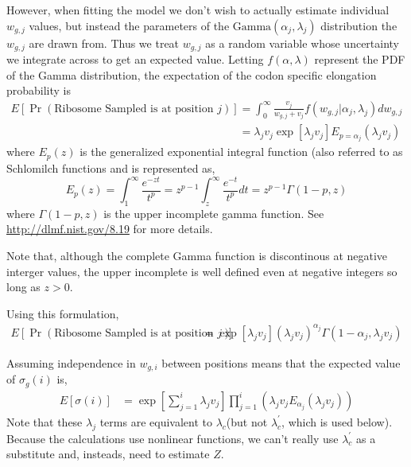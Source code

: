 \documentclass{article}
\newcommand{\elongWaitTime}{\ensuremath{w}\xspace}
\newcommand{\wgi}{\ensuremath{\elongWaitTime_{g,i}}\xspace}
\newcommand{\wgj}{\ensuremath{\elongWaitTime_{g,j}}\xspace}
\newcommand{\alphaj}{\ensuremath{{\alpha_j}}\xspace}
\newcommand{\lambdac}{\ensuremath{{\lambda_c}}\xspace}
\newcommand{\lambdacprime}{\ensuremath{{\lambda_c^\prime}}\xspace}
\newcommand{\lambdaj}{\ensuremath{{\lambda_j}}\xspace}
\newcommand{\nseWaitTime}{\ensuremath{v}\xspace}
\newcommand{\vj}{\ensuremath{\nseWaitTime_{j}}\xspace}
\newcommand{\sigmag}{\ensuremath{\sigma_{g}}\xspace}
\newcommand{\Esigmai}{\ensuremath{E\left[\sigma(i)\right]}\xspace}
\begin{document}
However, when fitting the model we don't wish to actually estimate individual \wgj values, but instead the parameters of the $\text{Gamma}\left(\alphaj, \lambdaj\right)$ distribution the \wgj are drawn from.
Thus we treat \wgj as a random variable whose uncertainty we integrate across to get an expected value.
Letting $f(\alpha, \lambda)$ represent the PDF of the Gamma distribution, the expectation of the codon specific elongation probability is
\begin{align}
\label{eq:defEElongPr}
E\left[\Pr(\text{Ribosome Sampled is at position $j$})\right] &= \int_0^\infty \frac{\vj}{\wgj + \vj} f\left(\wgj | \alphaj, \lambdaj\right) d\wgj\\
\label{eq:defEElongPrII}
 &= \lambdaj \vj \exp\left[\lambdaj \vj\right] E_{p = \alphaj}\left(\lambdaj \vj\right)
\end{align}
where $E_p(z)$ is the generalized exponential integral function (also referred to as Schlomilch functions \citep[][p.380]{OldhamEtAl2009} and is represented as,
\begin{equation}
  \label{eq:defGeneralizedExpoInt}
   E_p(z) = \int_1^\infty \frac{e^{-z t}}{t^p} = z^{p-1} \int_z^\infty \frac{e^{-t}}{t^p} dt = z^{p-1} \Gamma(1-p,z)
\end{equation}
where $\Gamma(1-p,z)$ is the upper incomplete gamma function.
See \href{http://dlmf.nist.gov/8.19}{http://dlmf.nist.gov/8.19} for more details.


Note that, although the complete Gamma function is discontinous at negative interger values, the upper incomplete is well defined even at negative integers so long as $z>0$.

Using this formulation, 
\begin{align}
\label{eq:defEElongPrIII}
E\left[\Pr(\text{Ribosome Sampled is at position $j$})\right] &= \exp\left[\lambdaj \vj\right] \left(\lambdaj \vj\right)^\alphaj  \Gamma(1-\alphaj, \lambdaj \vj)
\end{align}


Assuming independence in \wgi between positions means that the expected value of $\sigmag(i)$ is, 
\begin{align}
\label{eq:defESigma}
  \Esigmai &=  \exp\left[\sum_{j=1}^i \lambdaj \vj\right]  \prod_{j=1}^{i}\left(\lambdaj \vj  E_{\alphaj}\left(\lambdaj \vj\right) \right)
\end{align}
Note that these \lambdaj terms are equivalent to \lambdac (but not \lambdacprime, which is used below).
Because the calculations use nonlinear functions, we can't really use \lambdacprime as a substitute and, insteads, need to estimate $Z$.
\end{document}
